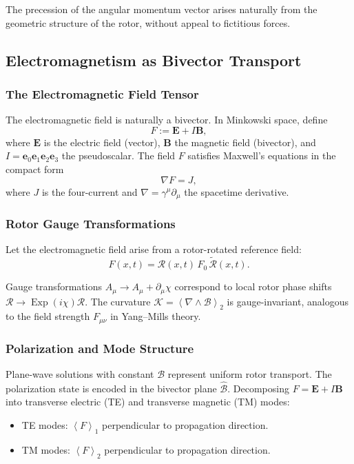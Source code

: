 \documentclass[11pt,a4paper]{article}
\newcommand{\e}{\mathbf{e}}
\newcommand{\grade}[2]{\left\langle #1 \right\rangle_{#2}}
\newcommand{\vecp}[1]{\grade{#1}{1}}
\newcommand{\biv}[1]{\grade{#1}{2}}
\newcommand{\rev}[1]{\widetilde{#1}}           %
\newcommand{\Exp}{\operatorname{Exp}}
\newcommand{\Rotor}{\mathcal{R}}
\newcommand{\Biv}{\mathcal{B}}
\newcommand{\D}{\nabla}                        %
\theoremstyle{definition}
\theoremstyle{plain}
\theoremstyle{remark}
\begin{document}
The precession of the angular momentum vector arises naturally from the geometric structure of the rotor, without appeal to fictitious forces.

\subsection{Electromagnetism as Bivector Transport}

\subsubsection{The Electromagnetic Field Tensor}

The electromagnetic field is naturally a bivector. In Minkowski space, define
\begin{equation}
F := \mathbf{E} + I\mathbf{B},
\end{equation}
where $\mathbf{E}$ is the electric field (vector), $\mathbf{B}$ the magnetic field (bivector), and $I = \e_0\e_1\e_2\e_3$ the pseudoscalar. The field $F$ satisfies Maxwell's equations in the compact form
\begin{equation}
\D F = J,
\end{equation}
where $J$ is the four-current and $\D = \gamma^\mu \partial_\mu$ the spacetime derivative.

\subsubsection{Rotor Gauge Transformations}

Let the electromagnetic field arise from a rotor-rotated reference field:
\begin{equation}
F(x,t) = \Rotor(x,t)\, F_0\, \rev{\Rotor}(x,t).
\end{equation}

Gauge transformations $A_\mu \to A_\mu + \partial_\mu \chi$ correspond to local rotor phase shifts $\Rotor \to \Exp(i\chi)\Rotor$. The curvature $\mathcal{K} = \biv{\D \wedge \Biv}$ is gauge-invariant, analogous to the field strength $F_{\mu\nu}$ in Yang--Mills theory.

\subsubsection{Polarization and Mode Structure}

Plane-wave solutions with constant $\Biv$ represent uniform rotor transport. The polarization state is encoded in the bivector plane $\hat{\Biv}$. Decomposing $F = \mathbf{E} + I\mathbf{B}$ into transverse electric (TE) and transverse magnetic (TM) modes:
\begin{itemize}
  \item TE modes: $\vecp{F}$ perpendicular to propagation direction.
  \item TM modes: $\biv{F}$ perpendicular to propagation direction.
\end{itemize}
\end{document}
